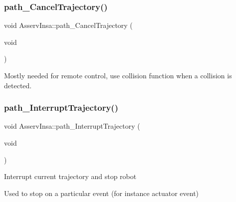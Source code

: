 \subsubsection{\texorpdfstring{path\+\_\+\+Cancel\+Trajectory()}{path\_CancelTrajectory()}}
{\footnotesize\ttfamily void Asserv\+Insa\+::path\+\_\+\+Cancel\+Trajectory (\begin{DoxyParamCaption}\item[{void}]{ }\end{DoxyParamCaption})}

Mostly needed for remote control, use collision function when a collision is detected. \mbox{\label{classAsservInsa_aef3d84dbdf3cf625978f25554202369e}} 
\subsubsection{\texorpdfstring{path\+\_\+\+Interrupt\+Trajectory()}{path\_InterruptTrajectory()}}
{\footnotesize\ttfamily void Asserv\+Insa\+::path\+\_\+\+Interrupt\+Trajectory (\begin{DoxyParamCaption}\item[{void}]{ }\end{DoxyParamCaption})}

Interrupt current trajectory and stop robot

Used to stop on a particular event (for instance actuator event) 

